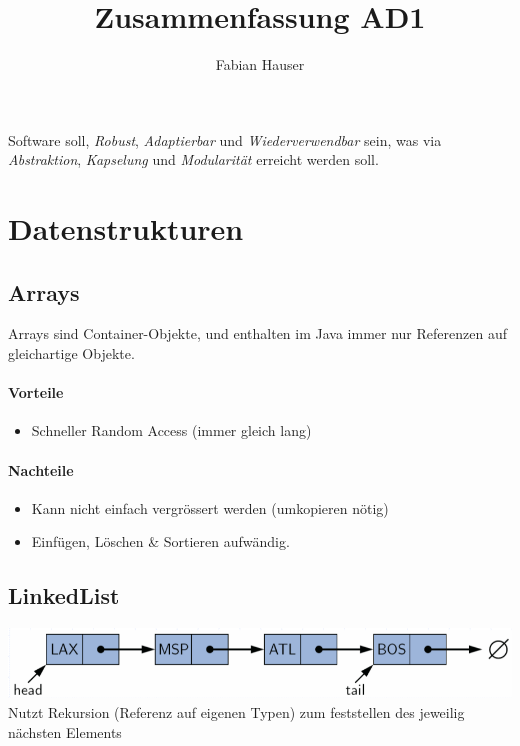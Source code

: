 

\title{Zusammenfassung AD1}
\author{Fabian Hauser}
 

\maketitle


Software soll, \emph{Robust}, \emph{Adaptierbar} und \emph{Wiederverwendbar} sein, was via \emph{Abstraktion}, \emph{Kapselung} und \emph{Modularität} erreicht werden soll.

\section{Datenstrukturen}
\subsection{Arrays}

Arrays sind Container-Objekte, und enthalten im Java immer nur Referenzen auf gleichartige Objekte.

\paragraph{Vorteile}
\begin{itemize}
	\item Schneller Random Access (immer gleich lang)
\end{itemize}

\paragraph{Nachteile}
\begin{itemize}
	\item Kann nicht einfach vergrössert werden (umkopieren nötig)
	\item Einfügen, Löschen \& Sortieren aufwändig.
\end{itemize}

\subsection{LinkedList}

\includegraphics[scale=0.3]{img/linkedlist.png} \\
Nutzt Rekursion (Referenz auf eigenen Typen) zum feststellen des jeweilig nächsten Elements

